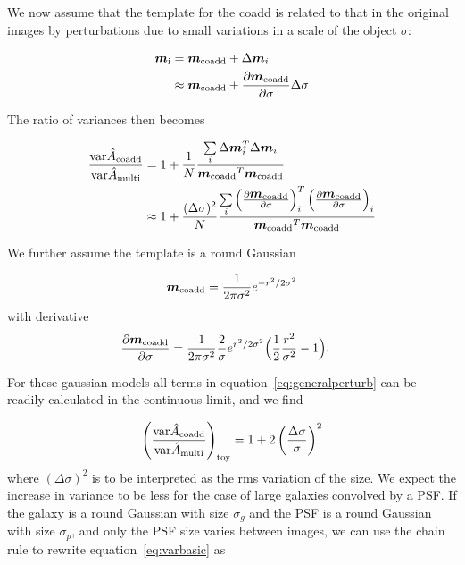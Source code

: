 \documentclass[fleqn,useAMS,usenatbib]{mnras}
\newcommand{\coadd}{{\rm coadd}}
\newcommand{\model}{\mbox{$\boldsymbol{m}$}}
\newcommand{\modelc}{\mbox{$\boldsymbol{m}_\coadd$}}
\begin{document}
We now assume that the template for the coadd is related to that
in the original images by perturbations due to small variations
in a scale of the object $\sigma$:

\begin{align}
\boldsymbol{m}_{\rm i} &= \boldsymbol{m}_\coadd + \Delta \boldsymbol{m}_i \\
&\approx \boldsymbol{m}_\coadd + \frac{\partial 
\boldsymbol{m}_\coadd}{\partial \sigma} \Delta \sigma
\end{align}

The ratio of variances then becomes

\begin{align} \label{eq:generalperturb}
\frac{ {\rm var} \hat{A}_\coadd }{{\rm var} \hat{A}_{\rm multi} } &=  
1 + \frac{1}{N}\frac{\sum\limits_i \Delta \model_i^T \Delta \model_i 
}{\modelc^T \modelc} \\
& \approx 
1 + \frac{(\Delta \sigma)^2}{N}\frac{\sum\limits_i \left( \frac{\partial 
\modelc}{\partial \sigma} \right)_i^T \left( \frac{\partial \modelc}{\partial 
\sigma} \right)_i }{\modelc^T \modelc}
\end{align}

We further assume the template is a round Gaussian

\begin{align}
\modelc = \frac{1}{2 \pi \sigma^2} e^{-r^2/2 \sigma^2 }
\end{align}
with derivative
\begin{align}
\frac{\partial \modelc}{\partial \sigma} &= \frac{1}{2 \pi \sigma^2} 
\frac{2}{\sigma} e^{r^2/2 \sigma^2} \Bigl( \frac{1}{2}\frac{r^2}{\sigma^2} - 1 
\Bigr).
\end{align}

For these gaussian models all terms in equation~\eqref{eq:generalperturb} can
be readily calculated in the continuous limit, and we find

\begin{align} \label{eq:varbasic}
\left( \frac{ {\rm var} \hat{A}_\coadd }{{\rm var} \hat{A}_{\rm multi} } 
\right)_{\rm toy} = 
1 + 2 \left( \frac{\Delta \sigma}{\sigma} \right)^2
\end{align}
where $(\Delta \sigma)^2$ is to be interpreted as the rms variation of the size.
We expect the increase in variance to be less for the case
of large galaxies convolved by a PSF.  If the galaxy is a round Gaussian with
size $\sigma_g$ and the PSF is a round Gaussian with size $\sigma_p$,
and only the PSF size varies between images,
we can use the chain rule to rewrite equation~\eqref{eq:varbasic} as
\end{document}
